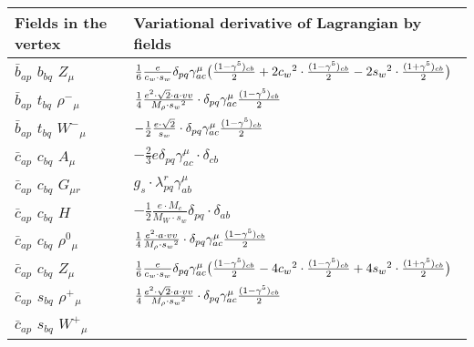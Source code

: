 \begin{center}
\begin{tabular}{|l|l|} \hline
Fields in the vertex & Variational derivative of Lagrangian by fields \\ \hline
$\bar{b}{}_{a p }$ \phantom{-} $b{}_{b q }$ \phantom{-} ${Z}_{\mu }$ \phantom{-}  &
	$\frac{1}{6}\frac{ e}{ c_w \cdot s_w}\delta_{p q} \gamma_{a c}^\mu \big({(1-\gamma^5)_{c b}\over 2} +2 c_w{}^2 \cdot {(1-\gamma^5)_{c b}\over 2} -2 s_w{}^2 \cdot {(1+\gamma^5)_{c b}\over 2} \big)$\\[2mm]
$\bar{b}{}_{a p }$ \phantom{-} $t{}_{b q }$ \phantom{-} $\rho^-{}_{\mu }$ \phantom{-}  &
	$\frac{1}{4}\frac{ e{}^2  \cdot\sqrt{2} \cdot a \cdot vv}{ M_{\rho} \cdot s_w{}^2 }\cdot \delta_{p q} \gamma_{a c}^\mu {(1-\gamma^5)_{c b}\over 2} $\\[2mm]
$\bar{b}{}_{a p }$ \phantom{-} $t{}_{b q }$ \phantom{-} $W^-{}_{\mu }$ \phantom{-}  &
	$-\frac{1}{2}\frac{ e \cdot\sqrt{2}}{ s_w}\cdot \delta_{p q} \gamma_{a c}^\mu {(1-\gamma^5)_{c b}\over 2} $\\[2mm]
$\bar{c}{}_{a p }$ \phantom{-} $c{}_{b q }$ \phantom{-} ${A}_{\mu }$ \phantom{-}  &
	$-\frac{2}{3} e\delta_{p q} \gamma_{a c}^\mu \cdot \delta_{c b} $\\[2mm]
$\bar{c}{}_{a p }$ \phantom{-} $c{}_{b q }$ \phantom{-} ${G}_{\mu r }$ \phantom{-}  &
	$ g_s\cdot \lambda_{p q}^r \gamma_{a b}^\mu $\\[2mm]
$\bar{c}{}_{a p }$ \phantom{-} $c{}_{b q }$ \phantom{-} ${H}_{}$ \phantom{-}  &
	$-\frac{1}{2}\frac{ e \cdot M_c}{ M_W \cdot s_w}\delta_{p q} \cdot \delta_{a b} $\\[2mm]
$\bar{c}{}_{a p }$ \phantom{-} $c{}_{b q }$ \phantom{-} $\rho^0{}_{\mu }$ \phantom{-}  &
	$\frac{1}{4}\frac{ e{}^2  \cdot a \cdot vv}{ M_{\rho} \cdot s_w{}^2 }\cdot \delta_{p q} \gamma_{a c}^\mu {(1-\gamma^5)_{c b}\over 2} $\\[2mm]
$\bar{c}{}_{a p }$ \phantom{-} $c{}_{b q }$ \phantom{-} ${Z}_{\mu }$ \phantom{-}  &
	$\frac{1}{6}\frac{ e}{ c_w \cdot s_w}\delta_{p q} \gamma_{a c}^\mu \big({(1-\gamma^5)_{c b}\over 2} -4 c_w{}^2 \cdot {(1-\gamma^5)_{c b}\over 2} +4 s_w{}^2 \cdot {(1+\gamma^5)_{c b}\over 2} \big)$\\[2mm]
$\bar{c}{}_{a p }$ \phantom{-} $s{}_{b q }$ \phantom{-} $\rho^+{}_{\mu }$ \phantom{-}  &
	$\frac{1}{4}\frac{ e{}^2  \cdot\sqrt{2} \cdot a \cdot vv}{ M_{\rho} \cdot s_w{}^2 }\cdot \delta_{p q} \gamma_{a c}^\mu {(1-\gamma^5)_{c b}\over 2} $\\[2mm]
$\bar{c}{}_{a p }$ \phantom{-} $s{}_{b q }$ \phantom{-} $W^+{}_{\mu }$ \phantom{-}  &

\end{tabular}
\end{center}
